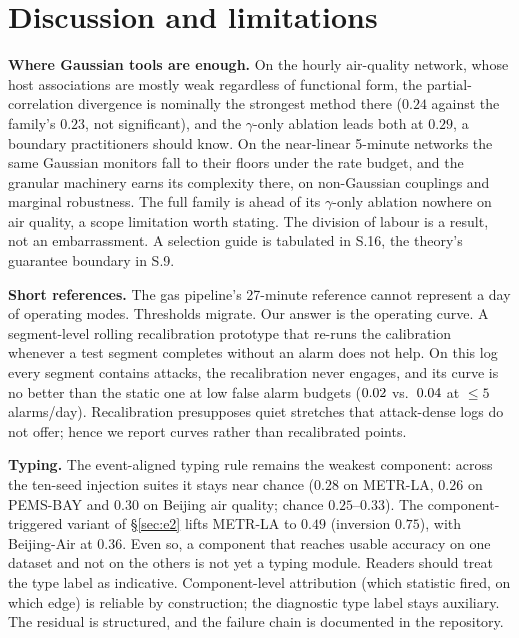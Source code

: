 \documentclass[11pt,a4paper]{article}
\begin{document}
\section{Discussion and limitations}\label{sec:discussion}

\textbf{Where Gaussian tools are enough.} On the hourly air-quality network, whose host associations are
mostly weak regardless of functional form, the
partial-correlation divergence is nominally the strongest method there
($0.24$ against the family's $0.23$, not significant), and the $\gamma$-only ablation leads both at $0.29$, a boundary practitioners
should know. On the near-linear 5-minute networks the same Gaussian
monitors fall to their floors under the rate budget, and the granular
machinery earns its complexity there, on non-Gaussian couplings and
marginal robustness. The full family is
ahead of its $\gamma$-only ablation nowhere on air quality, a scope limitation worth stating. The division of
labour is a result, not an embarrassment. A selection guide is tabulated
in S.16, the theory's guarantee boundary in S.9.

\textbf{Short references.} The gas pipeline's 27-minute reference cannot
represent a day of operating modes. Thresholds migrate. Our answer is the
operating curve. A segment-level rolling recalibration prototype that re-runs
the calibration whenever a test segment completes without an alarm does
not help. On this log every segment contains attacks, the recalibration
never engages, and its curve is no better than the static one at low false
alarm budgets ($0.02{}$ vs.\ $0.04{}$ at $\le 5$ alarms/day).
Recalibration presupposes quiet stretches that attack-dense logs do not
offer; hence we report curves rather than recalibrated points.

\textbf{Typing.} The event-aligned typing rule remains the weakest component:
across the ten-seed injection suites it stays near chance ($0.28$ on
METR-LA, $0.26$ on PEMS-BAY and $0.30$ on Beijing air quality; chance
$0.25$--$0.33$). The component-triggered variant of \S\ref{sec:e2} lifts METR-LA
to $0.49$ (inversion $0.75$), with Beijing-Air at $0.36$.
Even so, a component that reaches usable accuracy on
one dataset and not on the others is not yet a typing module. Readers
should treat the type label as indicative. Component-level attribution
(which statistic fired, on which edge) is reliable by construction; the
diagnostic type label stays auxiliary. The
residual is structured, and the failure chain is documented in the
repository.
\end{document}
